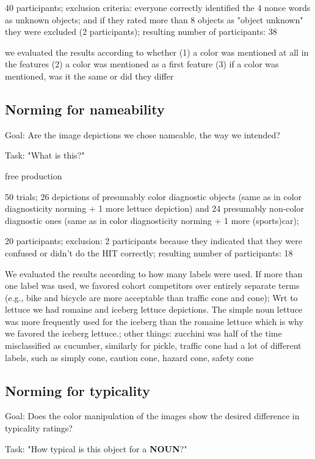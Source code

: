 \documentclass[a4paper,man,floatsintext,natbib,donotrepeattitle]{apa6}
\begin{document}
40 participants;
exclusion criteria: everyone correctly identified the 4 nonce words as unknown objects; and if they rated more than 8 objects as "object unknown" they were excluded (2 participants);
resulting number of participants: 38

we evaluated the results according to whether 
(1) a color was mentioned at all in the features
(2) a color was mentioned as a first feature
(3) if a color was mentioned, was it the same or did they differ

\subsection{Norming for nameability}

Goal: Are the image depictions we chose nameable, the way we intended?

Task: "What is this?"

free production

50 trials;
26 depictions of presumably color diagnostic objects (same as in color diagnosticity norming + 1 more lettuce depiction) and 24 presumably non-color diagnostic ones (same as in color diagnosticity norming + 1 more (sports)car);

20 participants;
exclusion: 2 participants because they indicated that they were confused or didn't do the HIT correctly;
resulting number of participants: 18

We evaluated the results according to how many labels were used. If more than one label was used, we favored cohort competitors over entirely separate terms (e.g., bike and bicycle are more acceptable than traffic cone and cone);
Wrt to lettuce we had romaine and iceberg lettuce depictions. The simple noun lettuce was more frequently used for the iceberg than the romaine lettuce which is why we favored the iceberg lettuce.; 
other things: zucchini was half of the time misclassified as cucumber, similarly for pickle, traffic cone had a lot of different labels, such as simply cone, caution cone, hazard cone, safety cone

\subsection{Norming for typicality}

Goal: Does the color manipulation of the images show the desired difference in typicality ratings?

Task: "How typical is this object for a \textbf{NOUN}?"
\end{document}
